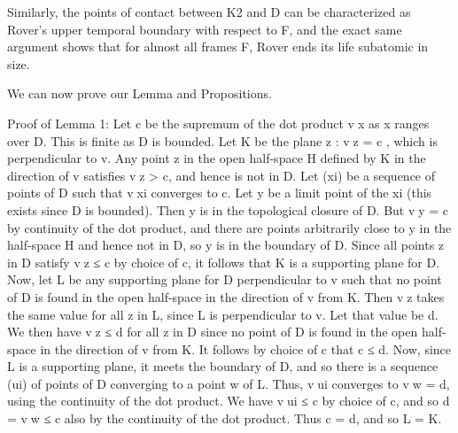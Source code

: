 \begin{lem}
Similarly, the points of contact between K2 and D can be characterized as Rover's upper temporal boundary with respect to F, and the exact same argument shows that for almost all frames F, Rover ends its life subatomic in size.

We can now prove our Lemma and Propositions.

Proof of Lemma 1: Let c be the supremum of the dot product vx as x ranges over D. This is finite as D is bounded. Let K be the plane { z : vz = c }, which is perpendicular to v. Any point z in the open half-space H defined by K in the direction of v satisfies vz > c, and hence is not in D. Let (xi) be a sequence of points of D such that vxi converges to c. Let y be a limit point of the xi (this exists since D is bounded). Then y is in the topological closure of D. But vy = c by continuity of the dot product, and there are points arbitrarily close to y in the half-space H and hence not in D, so y is in the boundary of D. Since all points z in D satisfy vz ≤ c by choice of c, it follows that K is a supporting plane for D. 
Now, let L be any supporting plane for D perpendicular to v such that no point of D is found in the open half-space in the direction of v from K. Then vz takes the same value for all z in L, since L is perpendicular to v. Let that value be d. We then have vz ≤ d for all z in D since no point of D is found in the open half-space in the direction of v from K. It follows by choice of c that c ≤ d. Now, since L is a supporting plane, it meets the boundary of D, and so there is a sequence (ui) of points of D converging to a point w of L. Thus, vui converges to vw = d, using the continuity of the dot product. We have vui ≤ c by choice of c, and so d = vw ≤ c also by the continuity of the dot product. Thus c = d, and so L = K.


\end{lem}

